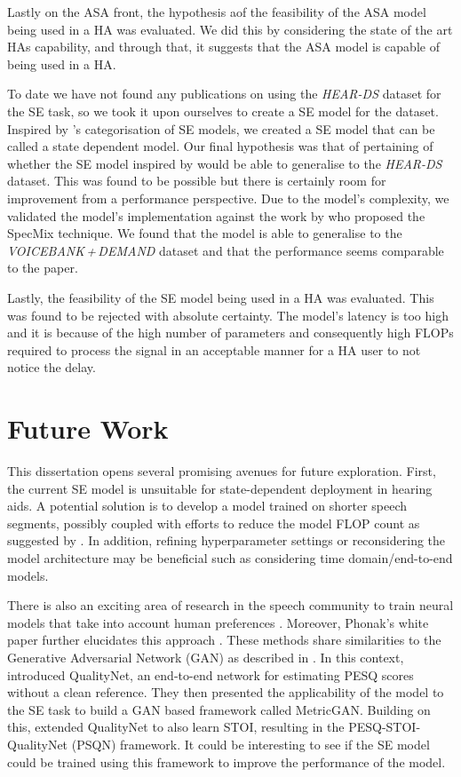 \documentclass[logo,bsc,singlespacing,parskip,online]{infthesis}
\newcommand{\heards}{\textit{HEAR-DS}\xspace}
\newcommand{\vbd}{\textit{VOICEBANK\,+\,DEMAND}\xspace}
\begin{document}
Lastly on the ASA front, 
the hypothesis aof the feasibility 
of the ASA model being used in a HA was 
evaluated. We did this by considering 
the state of the art HAs capability, and through that, 
it suggests that the ASA model is capable of being used 
in a HA.

To date we have not found any publications on 
using the \heards dataset for the SE task, so we 
took it upon ourselves to create a SE model 
for the dataset. Inspired by \citet{katagiri_handbook_2000}'s
categorisation of SE models, we created a SE model that can 
be called a state dependent model. Our final hypothesis was 
that of pertaining of whether the SE model inspired 
by \citet{tan18_interspeech} would be able to 
generalise to the \heards dataset. This was found 
to be possible but there is certainly room for improvement 
from a performance perspective. Due to the model's 
complexity, we validated the model's implementation 
against the work by \citet{kim_specmix_2021} who proposed 
the SpecMix technique. We found that the model is 
able to generalise to the \vbd dataset and that the 
performance seems comparable to the paper.

Lastly, the feasibility of the SE model being used 
in a HA was evaluated. This was found to be rejected 
with absolute certainty. The model's latency is too high and 
it is because of the high number of parameters and 
consequently high FLOPs required to process the 
signal in an acceptable manner for a HA user to not 
notice the delay.

\section{Future Work}
\label{sec:future-work}
This dissertation opens several promising avenues for future exploration.
First, the current SE model is unsuitable for state-dependent deployment
in hearing aids. A potential solution is to develop a model trained on
shorter speech segments, possibly coupled with efforts to reduce the model
FLOP count as suggested by \citet{liu_simple_2023}. In addition, refining
hyperparameter settings or reconsidering the model architecture may be 
beneficial such as considering time domain/end-to-end models.

There is also an exciting area of research in 
the speech community to train neural models 
that take into account human preferences \citep{Zhang2024SpeechAlignAS}.
Moreover, Phonak's white paper further elucidates
this approach \citep{Hasemann2024PhonakSphere}.
These methods share similarities to the Generative Adversarial Network (GAN)  
as described in \citet{Bai2022PerceptualLoss}. 
In this context, \citet{Fu2018QualityNet} introduced 
QualityNet, an end-to-end network for estimating PESQ scores without a clean
reference. They then presented the applicability of the model to the SE task
to build a GAN based framework called MetricGAN.
Building on this, \citet{Bai2022PerceptualLoss} extended QualityNet
to also learn STOI, resulting in the PESQ-STOI-QualityNet (PSQN) framework.
It could be interesting to see if the SE model could be trained using 
this framework to improve the performance of the model.
\end{document}

